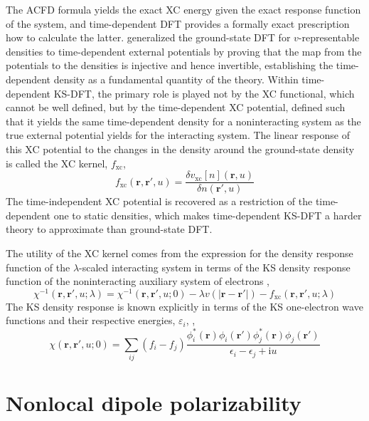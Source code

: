 The ACFD formula yields the exact XC energy given the exact response function of the system, and time-dependent DFT provides a formally exact prescription how to calculate the latter.
\citet{RungePRL84} generalized the ground-state DFT for $v$-representable densities to time-dependent external potentials by proving that the map from the potentials to the densities is injective and hence invertible, establishing the time-dependent density as a fundamental quantity of the theory.
Within time-dependent KS-DFT, the primary role is played not by the XC functional, which cannot be well defined, but by the time-dependent XC potential, defined such that it yields the same time-dependent density for a noninteracting system as the true external potential yields for the interacting system.
The linear response of this XC potential to the changes in the density around the ground-state density is called the XC kernel, $f_\text{xc}$,
\begin{equation}
  f_\text{xc}(\mathbf r,\mathbf r',u)=\frac{\delta v_\text{xc}[n](\mathbf r,u)}{\delta n(\mathbf r',u)}
\end{equation}
The time-independent XC potential is recovered as a restriction of the time-dependent one to static densities, which makes time-dependent KS-DFT a harder theory to approximate than ground-state DFT\@.

The utility of the XC kernel comes from the expression for the density response function of the $\lambda$-scaled interacting system in terms of the KS density response function of the noninteracting auxiliary system of electrons \citep{GrossPRL85},
\begin{equation}
  \chi^{-1}(\mathbf r,\mathbf r',u;\lambda)=\chi^{-1}(\mathbf r,\mathbf r',u;0)-\lambda v(|\mathbf r-\mathbf r'|)-f_\text{xc}(\mathbf r,\mathbf r',u;\lambda)
  \label{eq:dyson-td-dft}
\end{equation}
The KS density response is known explicitly in terms of the KS one-electron wave functions and their respective energies, $\varepsilon_i$, \citep{AdlerPR62,WiserPR63},
\begin{equation}
  \chi(\mathbf r,\mathbf r',u;0)=\sum_{ij}{(f_i-f_j)\frac{\phi_i^*(\mathbf r)\phi_i(\mathbf r')\phi_j^*(\mathbf r)\phi_j(\mathbf r')}{\epsilon_i-\epsilon_j+\mathrm iu}}
	\label{eq:adler-wiser}
\end{equation}

\section{Nonlocal dipole polarizability}

